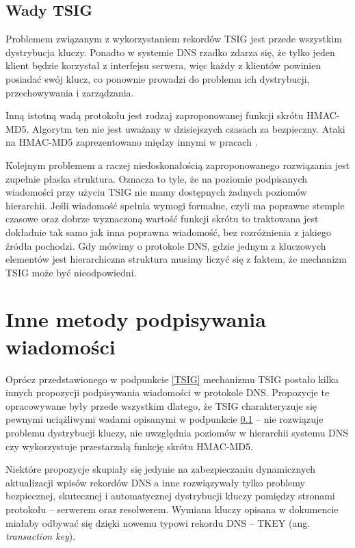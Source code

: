 \subsection{Wady TSIG}
\label{wady-tsig}
Problemem związanym z wykorzystaniem rekordów TSIG jest przede wszystkim dystrybucja kluczy. Ponadto w systemie DNS rzadko zdarza się, że tylko jeden klient będzie korzystał z interfejsu serwera, więc każdy z klientów powinien posiadać swój klucz, co ponownie prowadzi do problemu ich dystrybucji, przechowywania i zarządzania\cite{nask-tsig}.

Inną istotną wadą protokołu jest rodzaj zaproponowanej funkcji skrótu HMAC-MD5. Algorytm ten nie jest uważany w dzisiejszych czasach za bezpieczny. Ataki na HMAC-MD5 zaprezentowano między innymi w pracach \cite{hmac-md5-attack, hmac-md5-cryptoanalisys}.

Kolejnym problemem a raczej niedoskonałością zaproponowanego rozwiązania jest zupełnie płaska struktura. Oznacza to tyle, że na poziomie podpisanych wiadomości przy użyciu TSIG nie mamy dostępnych żadnych poziomów hierarchii. Jeśli wiadomość spełnia wymogi formalne, czyli ma poprawne stemple czasowe oraz dobrze wyznaczoną wartość funkcji skrótu to traktowana jest dokładnie tak samo jak inna poprawna wiadomość, bez rozróżnienia z jakiego źródła pochodzi. Gdy mówimy o protokole DNS, gdzie jednym z kluczowych elementów jest hierarchiczna struktura musimy liczyć się z faktem, że mechanizm TSIG może być nieodpowiedni.

\section{Inne metody podpisywania wiadomości}
Oprócz przedstawionego w podpunkcie \ref{TSIG} mechanizmu TSIG postało kilka innych propozycji podpisywania wiadomości w protokole DNS. Propozycje te opracowywane były przede wszystkim dlatego, że TSIG charakteryzuje się pewnymi uciążliwymi wadami opisanymi w podpunkcie \ref{wady-tsig} -- nie rozwiązuje problemu dystrybucji kluczy, nie uwzględnia poziomów w hierarchii systemu DNS czy wykorzystuje przestarzałą funkcję skrótu HMAC-MD5.

Niektóre propozycje skupiały się jedynie na zabezpieczaniu dynamicznych aktualizacji wpisów rekordów DNS \cite{RFC2137} a inne rozwiązywały tylko problemy bezpiecznej, skutecznej i automatycznej dystrybucji kluczy pomiędzy stronami protokołu -- serwerem oraz resolwerem\cite{RFC2930}. Wymiana kluczy opisana w dokumencie \cite{RFC2930} miałaby odbywać się dzięki nowemu typowi rekordu DNS -- TKEY (ang. \textit{transaction key}).


